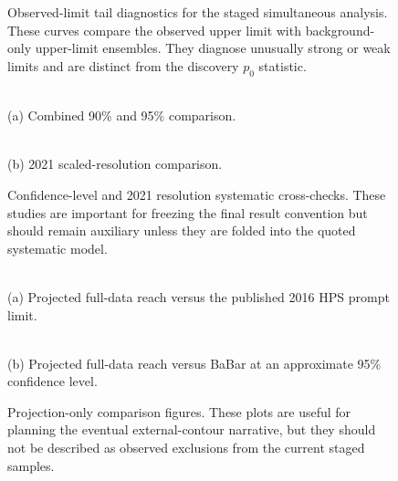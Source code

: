 \begin{figure}[t]
\centering
{}
\caption{Observed-limit tail diagnostics for the staged simultaneous analysis. These
curves compare the observed upper limit with background-only upper-limit ensembles.
They diagnose unusually strong or weak limits and are distinct from the discovery
$p_0$ statistic.}
\label{fig:app-tail-diagnostics}
\end{figure}

\begin{figure}[t]
\centering
\begin{minipage}{0.48\textwidth}
\centering
{}\\
(a) Combined 90\% and 95\% comparison.
\end{minipage}
\hfill
\begin{minipage}{0.48\textwidth}
\centering
{}\\
(b) 2021 scaled-resolution comparison.
\end{minipage}
\caption{Confidence-level and 2021 resolution systematic cross-checks. These studies
are important for freezing the final result convention but should remain auxiliary
unless they are folded into the quoted systematic model.}
\label{fig:app-systematic-crosschecks}
\end{figure}

\begin{figure}[t]
\centering
\begin{minipage}{0.48\textwidth}
\centering
{}\\
(a) Projected full-data reach versus the published 2016 HPS prompt limit.
\end{minipage}
\hfill
\begin{minipage}{0.48\textwidth}
\centering
{}\\
(b) Projected full-data reach versus BaBar at an approximate 95\% confidence level.
\end{minipage}
\caption{Projection-only comparison figures. These plots are useful for planning the
eventual external-contour narrative, but they should not be described as observed
exclusions from the current staged samples.}
\label{fig:app-projections}
\end{figure}
